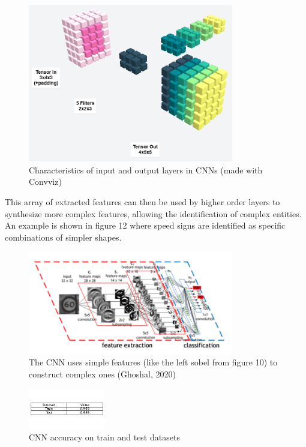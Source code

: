 \documentclass{article}
\begin{document}
\begin{figure}[h!]
    \centering
    \includegraphics[width=0.8\textwidth]{./plots/screenshot7.png}
    \caption{Characteristics of input and output layers in CNNs (made with Convviz)}
    \label{fig:plot13}
\end{figure}

This array of extracted features can then be used by higher order layers to synthesize more complex features, allowing the identification of complex entities.
An example is shown in figure 12 where speed signs are identified as specific combinations of simpler shapes.

\begin{figure}[h!]
    \centering
    \includegraphics[width=0.8\textwidth]{./plots/screenshot8.png}
    \caption{The CNN uses simple features (like the left sobel from figure 10) to construct complex ones (Ghoshal, 2020)}
    \label{fig:plot14}
\end{figure}

\begin{figure}[h!]
    \centering
    \includegraphics[width=0.3\textwidth]{./plots/plot12.png}
    \caption{CNN accuracy on train and test datasets}
    \label{fig:plot15}
\end{figure}
\end{document}
